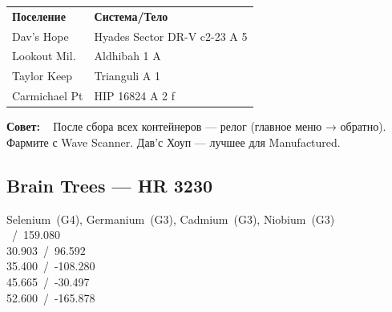 \begin{tabular}{p{18mm}p{40mm}}
\rowcolor{edheaderbg}
{\color{edorange}\fontsize{6.5}{8}\selectfont\bfseries Поселение} &
{\color{edorange}\fontsize{6.5}{8}\selectfont\bfseries Система/Тело}\\
\rowcolor{edtablebg}
{\fontsize{6.5}{8}\selectfont Dav's Hope} &
{\color{edgraytext}\fontsize{6.5}{8}\selectfont Hyades Sector DR-V c2-23 A 5}\\
\rowcolor{edtablealt}
{\fontsize{6.5}{8}\selectfont Lookout Mil.} &
{\color{edgraytext}\fontsize{6.5}{8}\selectfont Aldhibah 1 A}\\
\rowcolor{edtablebg}
{\fontsize{6.5}{8}\selectfont Taylor Keep} &
{\color{edgraytext}\fontsize{6.5}{8}\selectfont 12 Trianguli A 1}\\
\rowcolor{edtablealt}
{\fontsize{6.5}{8}\selectfont Carmichael Pt} &
{\color{edgraytext}\fontsize{6.5}{8}\selectfont HIP 16824 A 2 f}\\
\end{tabular}

\vspace{1.5mm}

\begin{tcolorbox}[edbox]
{\color{edorange}\fontsize{6.5}{8}\selectfont\bfseries Совет:}
{\color{edgraytext}\fontsize{6.5}{8}\selectfont~%
  После сбора всех контейнеров — релог (главное меню → обратно).
  Фармите с Wave Scanner. Дав'с Хоуп — лучшее для Manufactured.}
\end{tcolorbox}

\edsep

\subsection{Brain Trees — HR 3230}

\begin{tcolorbox}[edbox-blue, title=HR 3230 3 A A]
{\color{edgraytext}\fontsize{6.5}{7.5}\selectfont
  Selenium~(G4), Germanium~(G3), Cadmium~(G3), Niobium~(G3)}\\[1mm]
{\color{edblue}\fontsize{7.5}{9}\selectfont{}~/~159.080\\
  30.903~/~96.592\\
  35.400~/~-108.280\\
  45.665~/~-30.497\\
  52.600~/~-165.878}
\end{tcolorbox}

\vspace{1mm}

